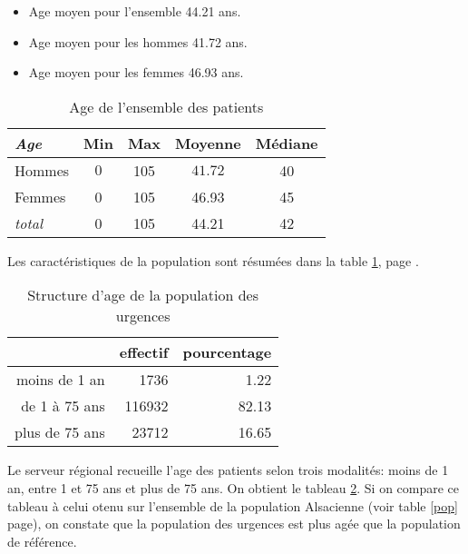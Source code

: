 \documentclass[12pt,english,french]{report}
\begin{document}

\begin{itemize}
  \item Age moyen pour l'ensemble 44.21 ans.
  \item Age moyen pour les hommes 41.72 ans.
  \item Age moyen pour les femmes 46.93 ans. 
\end{itemize}

\begin{table}
\begin{center}
\begin{tabular}{|l|c|c|c|c|}
  \hline
   \emph{Age} & Min & Max & Moyenne & Médiane \\
    \hline
    \hline
    Hommes & $0$ & 105 & $41.72$ & 40 \\
    \hline
    Femmes & 0 & 105 & 46.93 & 45 \\
    \hline
    \emph{total} & 0 & 105 & 44.21 & 42 \\
  \hline
\end{tabular}
\caption{Age de l'ensemble des patients}
\label{summary}
\end{center}
\end{table}

Les caractéristiques de la population sont résumées dans la table \ref{summary}, page \pageref{summary}.





\begin{table}[ht]
\centering
\begin{tabular}{rrr}
  \hline
 & effectif & pourcentage \\ 
  \hline
moins de 1 an & 1736 & 1.22 \\ 
  de 1 à 75 ans & 116932 & 82.13 \\ 
  plus de 75 ans & 23712 & 16.65 \\ 
   \hline
\end{tabular}
\caption{Structure d'age de la population des urgences} 
\label{age:serveur}
\end{table}Le serveur régional recueille l'age des patients selon trois modalités: moins de 1 an, entre 1 et 75 ans et plus de 75 ans. On obtient le tableau \ref{age:serveur}. Si on compare ce tableau à celui otenu sur l'ensemble de la population Alsacienne (voir table \ref{pop} page\pageref{pop}), on constate que la population des urgences est plus agée que la population de référence.
\end{document}
